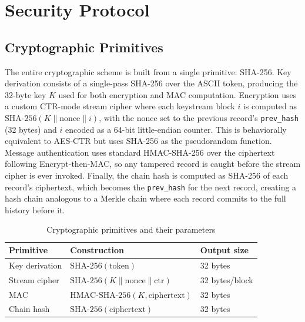 \documentclass[a4paper, 12pt]{article}
\begin{document}
    \section{Security Protocol}

    \subsection{Cryptographic Primitives}
    The entire cryptographic scheme is built from a single primitive: SHA-256. Key derivation consists of a single-pass SHA-256 over the ASCII token, producing the 32-byte key $K$ used for both encryption and MAC computation. Encryption uses a custom CTR-mode stream cipher where each keystream block $i$ is computed as $\text{SHA-256}(K \| \text{nonce} \| i)$, with the nonce set to the previous record's \texttt{prev\_hash} (32 bytes) and $i$ encoded as a 64-bit little-endian counter. This is behaviorally equivalent to AES-CTR but uses SHA-256 as the pseudorandom function. Message authentication uses standard HMAC-SHA-256 over the ciphertext following Encrypt-then-MAC, so any tampered record is caught before the stream cipher is ever invoked. Finally, the chain hash is computed as SHA-256 of each record's ciphertext, which becomes the \texttt{prev\_hash} for the next record, creating a hash chain analogous to a Merkle chain where each record commits to the full history before it.

    \begin{table}[H]
        \centering
        \begin{tabular}{lll}
            \toprule
            \textbf{Primitive} & \textbf{Construction} & \textbf{Output size} \\
            \midrule
            Key derivation & $\text{SHA-256}(\text{token})$ & 32 bytes \\
            Stream cipher & $\text{SHA-256}(K \| \text{nonce} \| \text{ctr})$ & 32 bytes/block \\
            MAC & $\text{HMAC-SHA-256}(K, \text{ciphertext})$ & 32 bytes \\
            Chain hash & $\text{SHA-256}(\text{ciphertext})$ & 32 bytes \\
            \bottomrule
        \end{tabular}
        \caption{Cryptographic primitives and their parameters}
    \end{table}
\end{document}
